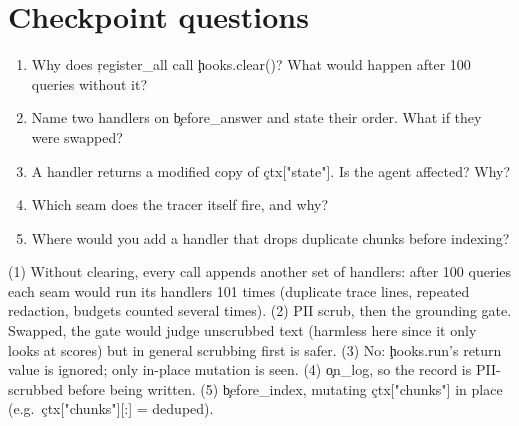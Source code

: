 \section{Checkpoint questions}
\begin{enumerate}
 \item Why does \c{register\_all} call \c{hooks.clear()}? What would happen after 100 queries without it?
 \item Name two handlers on \c{before\_answer} and state their order. What if they were swapped?
 \item A handler returns a modified copy of \c{ctx["state"]}. Is the agent affected? Why?
 \item Which seam does the tracer itself fire, and why?
 \item Where would you add a handler that drops duplicate chunks before indexing?
\end{enumerate}
\begin{solution}
(1) Without clearing, every call appends another set of handlers: after 100 queries each seam would run its handlers 101 times (duplicate trace lines, repeated redaction, budgets counted several times). (2) PII scrub, then the grounding gate. Swapped, the gate would judge unscrubbed text (harmless here since it only looks at scores) but in general scrubbing first is safer. (3) No: \c{hooks.run}'s return value is ignored; only in-place mutation is seen. (4) \c{on\_log}, so the record is PII-scrubbed before being written. (5) \c{before\_index}, mutating \c{ctx["chunks"]} in place (e.g.\ \c{ctx["chunks"][:] = deduped}).
\end{solution}
